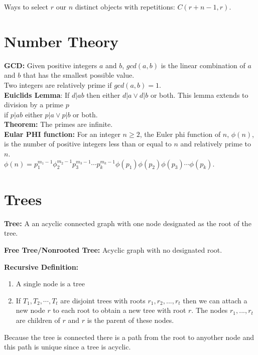 \documentclass[14pt]{extreport}
\begin{document}
Ways to select $r$ our $n$ distinct objects with repetitions: $C(r+n-1,r)$.\\

\section{Number Theory}
{\bf GCD:} Given positive integers $a$ and $b$, $gcd(a,b)$ is the linear combination of $a$ and $b$
that has the smallest possible value.\\

Two integers are relatively prime if $gcd(a,b)=1$.\\
{\bf Euiclids Lemma}: If $d|ab$ then either $d|a \lor d|b$ or both. This lemma extends to division by a prime $p$\\
if $p|ab$ either $p|a \lor p|b$ or both.\\
{\bf Theorem:} The primes are infinite.\\
{\bf Eular PHI function:} For an integer $n \ge 2$, the Euler phi function of $n$, $\phi(n)$, is the number of positive integers
less than or equal to $n$ and relatively prime to $n$.\\
$\phi (n) = p_1^{m_1 -1}\phi _2^{m_2-1}p_3^{m_3-1} \cdots p_k^{m_k-1}\phi (p_1)\phi (p_2)\phi (p_3) \cdots \phi (p_k)$.\\

\section{Trees}

{\bf Tree:} A an acyclic connected graph with one node designated as the root of the tree.

{\bf Free Tree/Nonrooted Tree:} Acyclic graph with no designated root.

{\bf Recursive Definition:}
\begin{enumerate}
    \item A single node is a tree
    \item If $T_1, T_2, \cdots , T_t$ are disjoint trees with roots $r_1, r_2, ..., r_t$ then we can attach a new node $r$ to each root
          to obtain a new tree with root $r$. The nodes $r_1, ..., r_t$ are children of $r$ and $r$ is the parent of these nodes.
\end{enumerate}

Because the tree is connected there is a path from the root to anyother node and this path is unique since a tree is acyclic.
\end{document}
